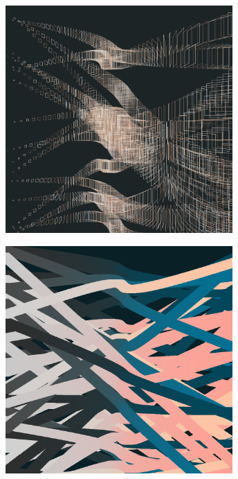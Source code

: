 \documentclass[11pt,twoside]{book}
\begin{document}
\begin{figure}[!ht]
\includegraphics[width=246pt]{copper-fbf9314d-ef04-4cf0-b9a4-882c898f61a2.png}
\end{figure}
\newpage
{}
\fancyfoot[CE,CO]{\fontsize{10}{12}\selectfont \thepage}
\begin{figure}[!ht]
\includegraphics[width=246pt]{slate-and-peach-19837770-700c-42df-a84b-afe576d29a88.png}
\end{figure}
\newpage
{}
\fancyfoot[CE,CO]{\fontsize{10}{12}\selectfont \thepage}
\end{document}
